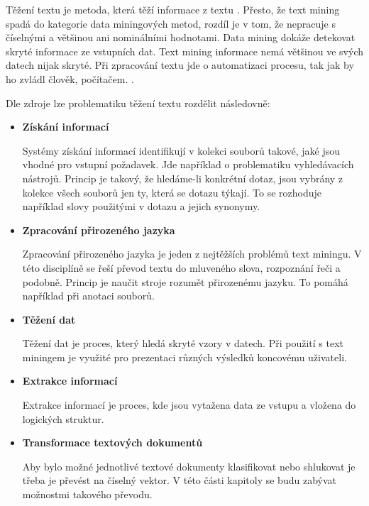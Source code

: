 \documentclass[thesis=M,czech]{FITthesis}[2012/10/20]
\begin{document}
		Těžení textu je metoda, která těží informace z textu \cite{WittenTextMining}. Přesto, že text mining spadá do kategorie data miningových metod, rozdíl je v tom, že nepracuje s číselnými a většinou ani nominálními hodnotami. Data mining dokáže detekovat skryté informace ze vstupních dat. Text mining informace nemá většinou ve svých datech nijak skryté. Při zpracování textu jde o automatizaci procesu, tak jak by ho zvládl člověk, počítačem. \cite{WittenTextMining}.
		
		Dle zdroje \cite{textAlg} lze problematiku těžení textu rozdělit následovně:
		
		\begin{itemize} 

		\item \textbf{Získání informací}
		
			Systémy získání informací identifikují v kolekci souborů takové, jaké jsou vhodné pro vstupní požadavek. Jde například o problematiku vyhledávacích nástrojů. Princip je takový, že hledáme-li konkrétní dotaz, jsou vybrány z kolekce všech souborů jen ty, která se dotazu týkají. To se rozhoduje například slovy použitými v dotazu a jejich synonymy.
		
		\item \textbf{Zpracování přirozeného jazyka}
		
			Zpracování přirozeného jazyka je jeden z nejtěžších problémů text miningu. V této disciplíně se řeší převod textu do mluveného slova, rozpoznání řeči a podobně. Princip je naučit stroje rozumět přirozenému jazyku. To pomáhá například při anotaci souborů.
			
		\item \textbf{Těžení dat}
		
			Těžení dat je proces, který hledá skryté vzory v datech. Při použití s text miningem je využité pro prezentaci různých výsledků koncovému uživateli.
			
		\item \textbf{Extrakce informací}
		
			Extrakce informací je proces, kde jsou vytažena data ze vstupu a vložena do logických struktur.\cite{SankarSureshTextMining}
		
		
		\item \textbf{Transformace textových dokumentů}
		
		 Aby bylo možné jednotlivé textové dokumenty klasifikovat nebo shlukovat je třeba je převést na číselný vektor. V této části kapitoly se budu zabývat možnostmi takového převodu.
	

\end{itemize}
\end{document}
